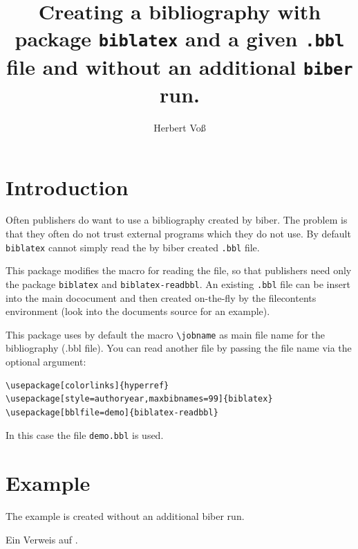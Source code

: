 \documentclass{article}
\title{Creating a bibliography with package \texttt{biblatex} 
and a given \texttt{.bbl} file and without an additional \texttt{biber} run.}
\author{Herbert Voß}
\begin{document}
\maketitle
\section{Introduction}
Often publishers do want to use a bibliography created by biber. The problem
is that they often do not trust external programs which they do not use.
By default \texttt{biblatex} cannot simply read the by biber created \texttt{.bbl} file.

This package modifies the macro for reading the file, so that publishers
need only the package \texttt{biblatex} and \texttt{biblatex-readbbl}.
An existing \texttt{.bbl} file can be insert into the main dococument and then created on-the-fly by the filecontents environment
(look into the documents source for an example).

This package uses by default the macro \verb|\jobname| as main file name
for the bibliography (.bbl file). You can read another file by passing
the file name via the optional argument:

\begin{verbatim}
\usepackage[colorlinks]{hyperref}
\usepackage[style=authoryear,maxbibnames=99]{biblatex}
\usepackage[bblfile=demo]{biblatex-readbbl}
\end{verbatim}

In this case the file \verb|demo.bbl| is used.


\section{Example}
The example is created without an additional biber run.



Ein Verweis auf \textcite{bertram}.~\parencite{markey}\par
\printbibliography
\end{document}
